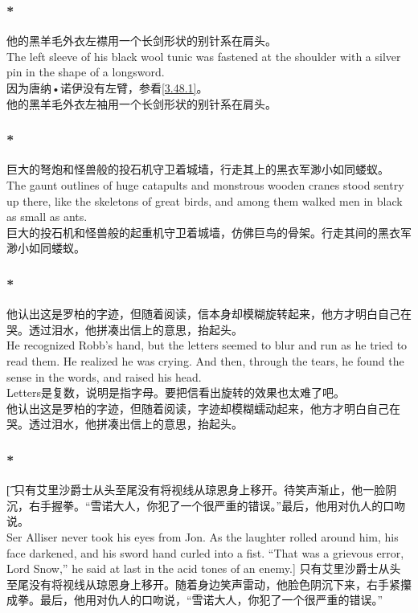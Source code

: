 \documentclass[12pt,a4paper]{article}
\newcommand{\h}[1]{{\color{red}#1}\\}
\newcommand{\la}[1]{{\color{blue}#1}\\}
\begin{document}
\subsubsection{\color{red}*}\label{1.19,2}\la{
	他的黑羊毛外衣左襟用一个长剑形状的别针系在肩头。\\
	The left sleeve of his black wool tunic was fastened at the shoulder with a silver pin in the shape of a longsword.}\h{
	因为唐纳•诺伊没有左臂，参看\ref{3.48.1}。}
	他的黑羊毛外衣左袖用一个长剑形状的别针系在肩头。
	
\subsubsection{\color{red}*}\la{
			巨大的弩炮和怪兽般的投石机守卫着城墙，行走其上的黑衣军渺小如同蝼蚁。\\
			The gaunt outlines of huge catapults and monstrous wooden cranes stood sentry up there, like the skeletons of great birds, and among them walked men in black as small as ants.}
			巨大的投石机和怪兽般的起重机守卫着城墙，仿佛巨鸟的骨架。行走其间的黑衣军渺小如同蝼蚁。
\subsubsection{\color{red}*}\la{
	他认出这是罗柏的字迹，但随着阅读，信本身却模糊旋转起来，他方才明白自己在哭。透过泪水，他拼凑出信上的意思，抬起头。\\
	He recognized Robb's hand, but the letters seemed to blur and run as he tried to read them. He realized he was crying. And then, through the tears, he found the sense in the words, and raised his head.}\h{
	Letters是复数，说明是指字母。要把信看出旋转的效果也太难了吧。}
	他认出这是罗柏的字迹，但随着阅读，字迹却模糊蠕动起来，他方才明白自己在哭。透过泪水，他拼凑出信上的意思，抬起头。
	
	\subsubsection{\color{red}*}\t[
	只有艾里沙爵士从头至尾没有将视线从琼恩身上移开。待笑声渐止，他一脸阴沉，右手握拳。“雪诺大人，你犯了一个很严重的错误。”最后，他用对仇人的口吻说。\\
	Ser Alliser never took his eyes from Jon. As the laughter rolled around him, his face darkened, and his sword hand curled into a fist. “That was a grievous error, Lord Snow,” he said at last in the acid tones of an enemy.]
	只有艾里沙爵士从头至尾没有将视线从琼恩身上移开。随着身边笑声雷动，他脸色阴沉下来，右手紧攥成拳。最后，他用对仇人的口吻说，“雪诺大人，你犯了一个很严重的错误。”
					
\end{document}
